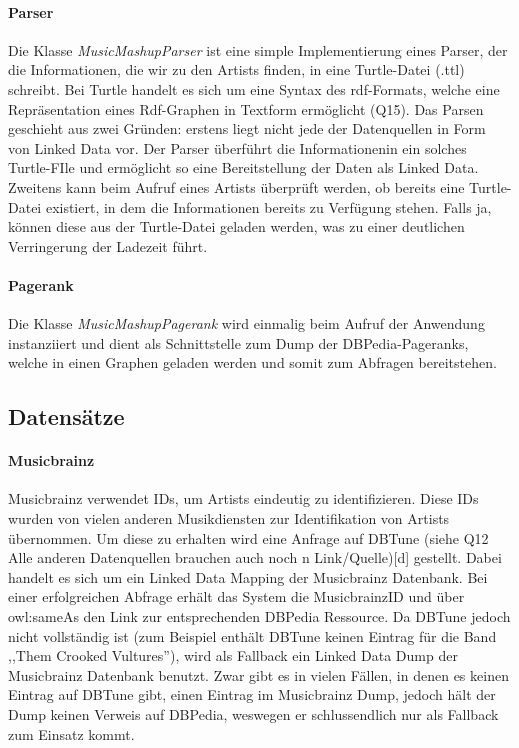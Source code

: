 \paragraph{Parser} Die Klasse \textit{MusicMashupParser} ist eine simple Implementierung eines Parser, der die Informationen, die wir zu den Artists finden, in eine Turtle-Datei (.ttl) schreibt. Bei Turtle handelt es sich um eine Syntax des rdf-Formats, welche eine Repräsentation eines Rdf-Graphen in Textform ermöglicht (Q15). Das Parsen geschieht aus zwei Gründen: erstens liegt nicht jede der Datenquellen in Form von Linked Data vor. Der Parser überführt die Informationenin ein solches Turtle-FIle und ermöglicht so eine Bereitstellung der Daten als Linked Data.  Zweitens kann beim Aufruf eines Artists überprüft werden, ob bereits eine Turtle-Datei existiert, in dem die Informationen bereits zu Verfügung stehen. Falls ja, können diese aus der Turtle-Datei geladen werden, was zu einer deutlichen Verringerung der Ladezeit führt.


\paragraph{Pagerank} Die Klasse \textit{MusicMashupPagerank} wird einmalig beim Aufruf der Anwendung instanziiert und dient als Schnittstelle zum Dump der DBPedia-Pageranks, welche in einen Graphen geladen werden und somit zum Abfragen bereitstehen.

\subsection{Datensätze}

\paragraph{Musicbrainz} Musicbrainz verwendet IDs, um Artists eindeutig zu identifizieren. Diese IDs wurden von vielen anderen Musikdiensten zur Identifikation von Artists übernommen. Um diese zu erhalten wird eine Anfrage auf DBTune (siehe Q12 Alle anderen Datenquellen brauchen auch noch n Link/Quelle)[d] gestellt. Dabei handelt es sich um ein Linked Data Mapping der Musicbrainz Datenbank. Bei einer erfolgreichen Abfrage erhält das System die MusicbrainzID und über owl:sameAs den Link zur entsprechenden DBPedia Ressource. Da DBTune jedoch nicht vollständig ist (zum Beispiel enthält DBTune keinen Eintrag für die Band ,,Them Crooked Vultures''), wird als Fallback ein Linked Data Dump der Musicbrainz Datenbank benutzt. Zwar gibt es in vielen Fällen, in denen es keinen Eintrag auf DBTune gibt, einen Eintrag im Musicbrainz Dump, jedoch hält der Dump keinen Verweis auf DBPedia, weswegen er schlussendlich nur als Fallback zum Einsatz kommt. %

